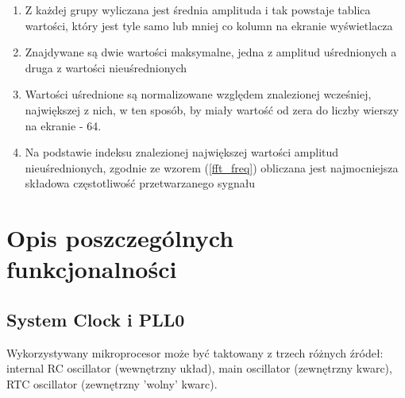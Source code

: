 \documentclass{article}
\begin{document}
\begin{enumerate}
    \item Z każdej grupy wyliczana jest średnia amplituda i tak powstaje tablica wartości, który jest tyle samo lub mniej co kolumn na ekranie wyświetlacza
    \item Znajdywane są dwie wartości maksymalne, jedna z amplitud uśrednionych a druga z wartości nieuśrednionych
    \item Wartości uśrednione są normalizowane względem znalezionej wcześniej, największej z nich, w ten sposób, by miały wartość od zera do liczby wierszy na ekranie - 64.
    \item Na podstawie indeksu znalezionej największej wartości amplitud nieuśrednionych, zgodnie ze wzorem (\ref{fft_freq}) obliczana jest najmocniejsza składowa częstotliwość przetwarzanego sygnału
\end{enumerate}

\section{Opis poszczególnych funkcjonalności}

\subsection{System Clock i PLL0}
Wykorzystywany mikroprocesor może być taktowany z trzech różnych źródeł: internal RC oscillator (wewnętrzny układ), main oscillator (zewnętrzny kwarc), RTC oscillator (zewnętrzny 'wolny' kwarc). 
\end{document}
